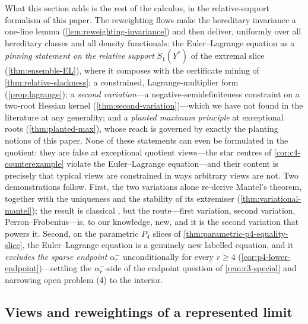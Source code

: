 \documentclass[11pt]{article}
\theoremstyle{definition}
\newcommand{\vtype}{\mathsf{1}}
\begin{document}
What this section adds is the rest of the calculus, in the relative-support formalism
of this paper.  The reweighting flows make the hereditary invariance a one-line lemma
(\cref{lem:reweighting-invariance}) and then deliver, uniformly over all hereditary
classes and all density functionals: the Euler--Lagrange equation as a \emph{pinning
statement on the relative support} $S_\vtype(Y^\ast)$ of the extremal slice
(\cref{thm:ensemble-EL}), where it composes with the certificate mining of
\cref{thm:relative-slackness}; a constrained, Lagrange-multiplier form
(\cref{prop:lagrange}); a \emph{second variation}---a negative-semidefiniteness
constraint on a two-root Hessian kernel (\cref{thm:second-variation})---which we have
not found in the literature at any generality; and a \emph{planted maximum principle}
at exceptional roots (\cref{thm:planted-max}), whose reach is governed by exactly the
planting notions of this paper.  None of these statements can even be formulated in the
quotient: they are false at exceptional quotient views---the star centres of
\cref{cor:c4-counterexample} violate the Euler--Lagrange equation---and their content
is precisely that typical views are constrained in ways arbitrary views are not.  Two
demonstrations follow.  First, the two variations alone re-derive Mantel's theorem,
together with the uniqueness and the stability of its extremiser
(\cref{thm:variational-mantel}); the result is classical
\cite[Theorem~16.23]{Lovasz2012book}, but the route---first variation, second
variation, Perron--Frobenius---is, to our knowledge, new, and it is the second
variation that powers it.  Second, on the parametric $P_4$ slices of
\cref{thm:parametric-p4-equality-slice}, the Euler--Lagrange equation is a genuinely
new labelled equation, and it \emph{excludes the sparse endpoint}
$\alpha_r^-$ unconditionally for every $r\ge4$
(\cref{cor:p4-lower-endpoint})---settling the
$\alpha_r^-$-side of the endpoint question of \cref{rem:r3-special} and narrowing open
problem (4) to the interior.

\subsection{Views and reweightings of a represented limit}
\end{document}
